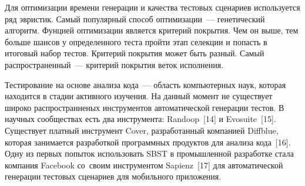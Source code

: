 Для оптимизации времени генерации и качества тестовых сценариев используется ряд эвристик. Самый популярный способ оптимизации~--- генетический алгоритм. Фунцией оптимизации является критерий покрытия. Чем он выше, тем больше шансов у определенного теста пройти этап селекции и попасть в итоговый набор тестов. Критерий покрытия может быть разный. Самый распространенный~--- критерий покрытия веток исполнения. 

Тестирование на основе анализа кода~--- область компьютерных наук, которая находится в стадии активного изучения. На данный момент не существует широко распространненых инструментов автоматической генерации тестов. В научных сообществах есть два инструмента: Randoop~[14] и Evosuite~[15]. Существует платный инструмент Cover, разработанный компанией Diffblue, которая занимается разработкой программных продуктов для анализа кода~[16].  Одну из первых попыток использовать SBST в промышленной разработке стала компания Facebook со~своим инструментом Sapienz~[17] для автоматической генерации тестовых сценариев для мобильного приложения. 

